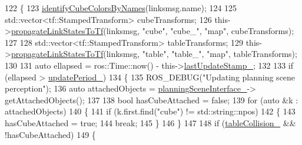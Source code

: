 \begin{DoxyCode}
122             \{
123                 \hyperlink{classsm__moveit__4_1_1cl__perception__system_1_1ClPerceptionSystem_a31de68bff6b7e96df405b04b421d957f}{identifyCubeColorsByNames}(linksmsg.name);
124 
125                 std::vector<tf::StampedTransform> cubeTransforms;
126                 this->\hyperlink{classsm__moveit__4_1_1cl__perception__system_1_1ClPerceptionSystem_a9e19707fd890d6503ac417d8c89ba4d9}{propagateLinkStatesToTf}(linksmsg, \textcolor{stringliteral}{"cube"}, \textcolor{stringliteral}{"cube\_"}, \textcolor{stringliteral}{"map"}, 
      cubeTransforms);
127 
128                 std::vector<tf::StampedTransform> tableTransforms;
129                 this->\hyperlink{classsm__moveit__4_1_1cl__perception__system_1_1ClPerceptionSystem_a9e19707fd890d6503ac417d8c89ba4d9}{propagateLinkStatesToTf}(linksmsg, \textcolor{stringliteral}{"table"}, \textcolor{stringliteral}{"table\_"}, \textcolor{stringliteral}{"map"}, 
      tableTransforms);
130 
131                 \textcolor{keyword}{auto} ellapsed = ros::Time::now() - this->\hyperlink{classsm__moveit__4_1_1cl__perception__system_1_1ClPerceptionSystem_a848e2ccea34c23ab22846e4c43b0164d}{lastUpdateStamp\_};
132 
133                 \textcolor{keywordflow}{if} (ellapsed > \hyperlink{classsm__moveit__4_1_1cl__perception__system_1_1ClPerceptionSystem_a0cd8e545b3a0744f6e6c235d9e47d740}{updatePeriod\_})
134                 \{
135                     ROS\_DEBUG(\textcolor{stringliteral}{"Updating planning scene perception"});
136                     \textcolor{keyword}{auto} attachedObjects = \hyperlink{classsm__moveit__4_1_1cl__perception__system_1_1ClPerceptionSystem_a7b0311554dc2efc15db1999adea877cb}{planningSceneInterface\_}->
      getAttachedObjects();
137 
138                     \textcolor{keywordtype}{bool} hasCubeAttached = \textcolor{keyword}{false};
139                     \textcolor{keywordflow}{for} (\textcolor{keyword}{auto} &k : attachedObjects)
140                     \{
141                         \textcolor{keywordflow}{if} (k.first.find(\textcolor{stringliteral}{"cube"}) != std::string::npos)
142                         \{
143                             hasCubeAttached = \textcolor{keyword}{true};
144                             \textcolor{keywordflow}{break};
145                         \}
146                     \}
147 
148                     \textcolor{keywordflow}{if} (\hyperlink{classsm__moveit__4_1_1cl__perception__system_1_1ClPerceptionSystem_ab8cc53236e3a3dfaa05ab35c843a6563}{tableCollision\_} && !hasCubeAttached)
149                     \{

\end{DoxyCode}
